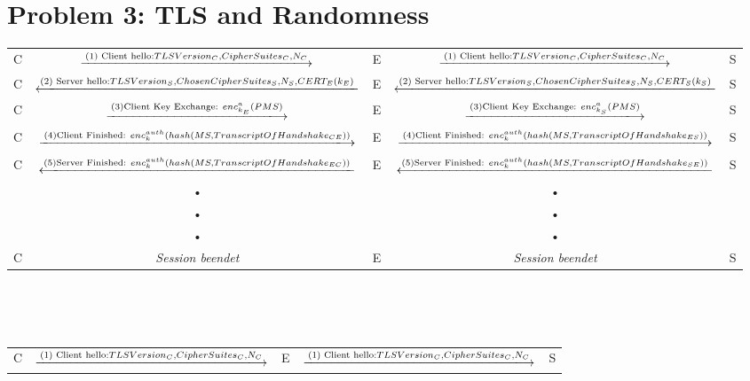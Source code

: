 \documentclass[12pt,pdftex,a4paper]{article}
\begin{document}
\begin{sidewaystable}[ph!]

\section*{Problem 3: TLS and Randomness}
	\begin{tabular}{|c|c|c|c|c|}
		C &  $\xlongrightarrow{\text{(1) Client hello:} TLSVersion_{C},  CipherSuites_{C}, N_{C}}$  & E &  $\xlongrightarrow{\text{(1) Client hello:} TLSVersion_{C},  CipherSuites_{C}, N_{C}}$   & S \\ 
		
		C &  $\xlongleftarrow{\text{(2) Server hello:} TLSVersion_{S},  ChosenCipherSuites_{S}, N_{S}, CERT_{E}(k_{E})}$ & E &  $\xlongleftarrow{\text{(2) Server hello:} TLSVersion_{S},  ChosenCipherSuites_{S}, N_{S}, CERT_{S}(k_{S})}$ & S \\ 
		
		C &  $\xlongrightarrow{\text{(3)Client Key Exchange: } enc^{a}_{k_{E}}(PMS)}$  & E &  $\xlongrightarrow{\text{(3)Client Key Exchange: } enc^{a}_{k_{S}}(PMS)}$  & S \\ 
		
		C &  $\xlongrightarrow{\text{(4)Client Finished: } enc_{k}^{auth}(hash(MS, TranscriptOfHandshake_{CE}))}$  & E &  $\xlongrightarrow{\text{(4)Client Finished: } enc_{k}^{auth}(hash(MS, TranscriptOfHandshake_{ES}))}$  & S \\ 
		
		C &  $\xlongleftarrow{\text{(5)Server Finished: } enc_{k}^{auth}(hash(MS, TranscriptOfHandshake_{EC}))}$ & E &  $\xlongleftarrow{\text{(5)Server Finished: } enc_{k}^{auth}(hash(MS, TranscriptOfHandshake_{SE}))}$ & S \\ 
		& • &  & • &  \\ 
		& • &  & • &  \\ 
		& • &  & • &  \\ 
		C & \textit{Session beendet} & E & \textit{Session beendet} & S \\ 
	\end{tabular} 
	\\\\
	\\
	\begin{tabular}{|c|c|c|c|c|}
		C &  $\xlongrightarrow{\text{(1) Client hello:} TLSVersion_{C},  CipherSuites_{C}, N_{C}}$  & E &  $\xlongrightarrow{\text{(1) Client hello:} TLSVersion_{C},  CipherSuites_{C}, N_{C}}$   & S \\ 
		

\end{tabular}
\end{sidewaystable}
\end{document}
